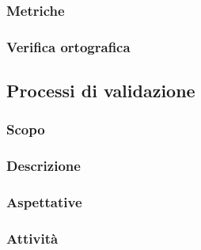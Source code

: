 \subsubsection{Metriche}

\subsubsection{Verifica ortografica}

\subsection{Processi di validazione}

\subsubsection{Scopo}

\subsubsection{Descrizione}

\subsubsection{Aspettative}

\subsubsection{Attività}

